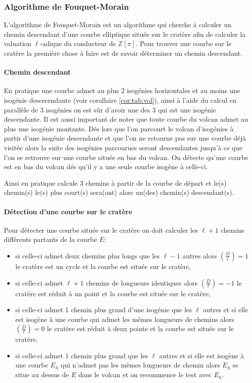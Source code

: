 \documentclass[10pt,a4paper]{book}
\theoremstyle{plain}
\theoremstyle{definition}
\theoremstyle{definition}
\theoremstyle{definition}
\theoremstyle{definition}
\theoremstyle{remark}
\theoremstyle{remark}
\theoremstyle{definition}
\begin{document}
\subsubsection{Algorithme de Fouquet-Morain}
\label{sub:alg:FM}
L'algorithme de Fouquet-Morain \cite{FouquetMorain02} est un algorithme qui cherche à calculer un chemin descendant d'une courbe elliptique située sur le cratère afin de calculer la valuation $\ell$-adique du conducteur de $\mathbb{Z}[\pi]$. Pour trouver une courbe sur le cratère la première chose à faire est de savoir déterminer un chemin descendant. 

\paragraph{Chemin descendant}
En pratique une courbe admet au plus $2$ isogénies horizontales et au moins une isogénie descecendante (voir corollaire \ref{cor:tab:vol}), ainsi à l'aide du calcul en parallèle de 3 isogénies on est sûr d'avoir une des 3 qui est une isogénie descendante. Il est aussi important de noter que toute courbe du volcan admet au plus une isogénie montante. Dés lors que l'on parcourt le volcan d'isogénies à partir d'une isogénie descendante et que l'on ne retourne pas sur une courbe déjà visitée alors la suite des isogénies parcourues seront descendantes jusqu'à ce que l'on se retrouve sur une courbe située en bas du volcan. On détecte qu'une courbe est en bas du volcan dés qu'il y a une seule courbe isogène à celle-ci.

Ainsi en pratique \cite{FouquetMorain02} calcule 3 chemins à partir de la courbe de départ et le(s) chemin(s) le(s) plus court(s) sera(ont) alors un(des) chemin(s) descendant(s). 

\paragraph{Détection d'une courbe sur le cratère}
Pour détecter une courbe située sur le cratère on doit calculer les $\ell+1$ chemins différents partants de la courbe $E$:
\begin{itemize}
\item si celle-ci admet deux chemins plus longs que les $\ell-1$ autres alors 
$\left( \frac{D}{\ell} \right) = 1$ le cratère est un cycle et la courbe est
située sur le cratère,
\item si celle-ci admet $\ell+1$ chemins de longueurs identiques alors $\left( 
\frac{D}{\ell} \right) = -1$ le cratère est réduit à un point et la courbe est
située sur le cratère,
\item si celle-ci admet $1$ chemin plus grand d'une isogénie que les $\ell$ 
autres et si elle est isogène à une courbe qui admet les mêmes longueurs de 
chemins alors $\left( \frac{D}{\ell} \right) = 0$ le cratère est réduit à deux 
points et la courbe est située sur le cratère,
\item si celle-ci admet $1$ chemin plus grand que les $\ell$ autres et si elle 
est isogène à une courbe $E_h$ qui n'admet pas les mêmes longueurs de chemin 
alors $E_h$ se situe au dessus de $E$ dans le volcan et on recommence le test 
avec $E_h$.
\end{itemize}
\end{document}

